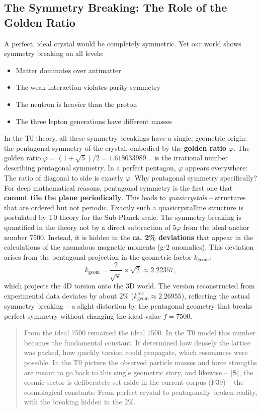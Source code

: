 	\subsection{The Symmetry Breaking: The Role of the Golden Ratio}
	A perfect, ideal crystal would be completely symmetric. Yet our world shows symmetry breaking on all levels:
	\begin{itemize}
		\item Matter dominates over antimatter
		\item The weak interaction violates parity symmetry
		\item The neutron is heavier than the proton
		\item The three lepton generations have different masses
	\end{itemize}
	In the T0 theory, all these symmetry breakings have a single, geometric origin: the pentagonal symmetry of the crystal, embodied by the \textbf{golden ratio} \(\varphi\).
	The golden ratio \(\varphi = (1+\sqrt{5})/2 = 1.618033989\ldots\) is the irrational number describing pentagonal symmetry. In a perfect pentagon, \(\varphi\) appears everywhere: The ratio of diagonal to side is exactly \(\varphi\).
	Why pentagonal symmetry specifically? For deep mathematical reasons, pentagonal symmetry is the first one that \textbf{cannot tile the plane periodically}. This leads to \emph{quasicrystals} – structures that are ordered but not periodic. Exactly such a quasicrystalline structure is postulated by T0 theory for the Sub-Planck scale.
	The symmetry breaking is quantified in the theory not by a direct subtraction of \(5\varphi\) from the ideal anchor number 7500. Instead, it is hidden in the \textbf{ca. 2\% deviations} that appear in the calculations of the anomalous magnetic moments (g-2 anomalies). This deviation arises from the pentagonal projection in the geometric factor \(k_\text{geom}\):
	\begin{equation}
		k_\text{geom} = \frac{2}{\sqrt{\varphi}} \times \sqrt{2} \approx 2.22357,
	\end{equation}
	which projects the 4D torsion onto the 3D world. The version reconstructed from experimental data deviates by about 2\% (\(k_\text{geom}^\text{rec} \approx 2.26955\)), reflecting the actual symmetry breaking – a slight distortion by the pentagonal geometry that breaks perfect symmetry without changing the ideal value \(f = 7500\).
	\begin{quotation}
		From the ideal 7500 remained the ideal 7500. In the T0 model this number becomes the fundamental constant. It determined how densely the lattice was packed, how quickly torsion could propagate, which resonances were possible.
		In the T0 picture the observed particle masses and force strengths are meant to go back to this single geometric story, and likewise -- \textbf{[S]}, the cosmic sector is deliberately set aside in the current corpus (P39) -- the cosmological constants: From perfect crystal to pentagonally broken reality, with the breaking hidden in the 2\%.
	\end{quotation}
	
